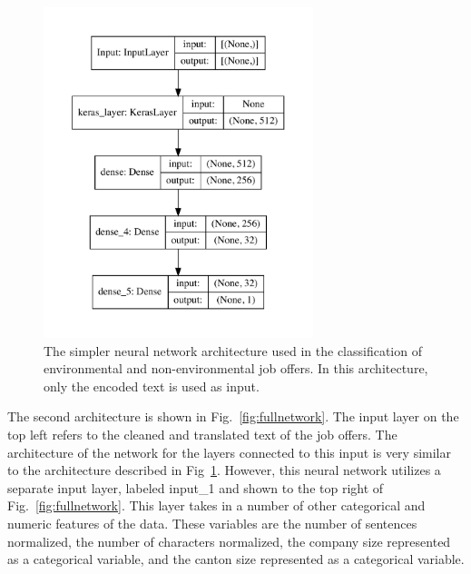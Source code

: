 \begin{figure}[htbp]
  \centering
    \includegraphics[width=0.7\textwidth]{figures/NeuralNetArch_OnlySentences.pdf}
    \caption[The simpler neural network architecture used in the classification of environmental and non-environmental job offers]{
    The simpler neural network architecture used in the classification of environmental and non-environmental job offers. In this architecture, only the encoded text is used as input.
    }
\label{fig:simplenetwork}
\end{figure}


The second architecture is shown in Fig.~\ref{fig:fullnetwork}. The input layer on the top left refers to the cleaned and translated text of the job offers. The architecture of the network for the layers connected to this input is very similar to the architecture described in Fig~\ref{fig:simplenetwork}. However, this neural network utilizes a separate input layer, labeled input\_1 and shown to the top right of Fig.~\ref{fig:fullnetwork}. This layer takes in a number of other categorical and numeric features of the data. These variables are the number of sentences normalized, the number of characters normalized, the company size represented as a categorical variable, and the canton size represented as a categorical variable. 

